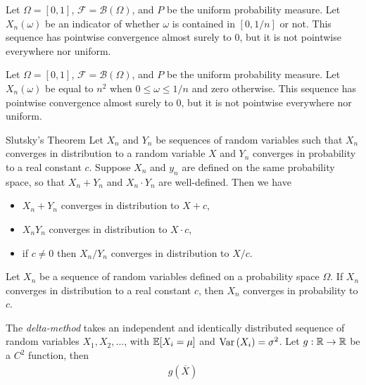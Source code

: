 \begin{exmp}
    Let $\Omega = [0, 1]$, $\mathcal{F} = \mathcal{B}(\Omega)$, and $P$ be the uniform probability measure. Let $X_n(\omega)$ be an indicator of whether $\omega$ is contained in $[0, 1/n]$ or not. This sequence has pointwise convergence almost surely to $0$, but it is not pointwise everywhere nor uniform.
\end{exmp}

\begin{exmp}
    Let $\Omega = [0, 1]$, $\mathcal{F} = \mathcal{B}(\Omega)$, and $P$ be the uniform probability measure. Let $X_n(\omega)$ be equal to $n^2$ when $0 \leq \omega \leq 1/n$ and zero otherwise. This sequence has pointwise convergence almost surely to $0$, but it is not pointwise everywhere nor uniform.
\end{exmp}

\begin{thm}{Slutsky's Theorem}\label{slutsky}\proofbreak
    Let $X_n$ and $Y_n$ be sequences of random variables such that $X_n$ converges in distribution to a random variable $X$ and $Y_n$ converges in probability to a real constant $c$. Suppose $X_n$ and $y_n$ are defined on the same probability space, so that $X_n + Y_n$ and $X_n \cdot Y_n$ are well-defined. Then we have
    \begin{itemize}
        \item $X_n + Y_n$ converges in distribution to $X + c$,
        \item $X_nY_n$ converges in distribution to $X \cdot c$,
        \item if $c \neq 0$ then $X_n / Y_n$ converges in distribution to $X/c$.
    \end{itemize}
\end{thm}

\begin{lemma}
    Let $X_n$ be a sequence of random variables defined on a probability space $\Omega$. If $X_n$ converges in distribution to a real constant $c$, then $X_n$ converges in probability to $c$.
\end{lemma}

\begin{defn}
    The \emph{delta-method} takes an independent and identically distributed sequence of random variables $X_1, X_2, \ldots$, with $\operatorname{\mathbb{E}}\!\left[{X_i = \mu}\right]$ and $\operatorname{Var}\left(X_i\right) = \sigma^2$. Let $g: \mathbb{R} \to \mathbb{R}$ be a $C^2$ function, then
    \begin{align}
        g\left(\overline{X}\right)
    \end{align}
\end{defn}

